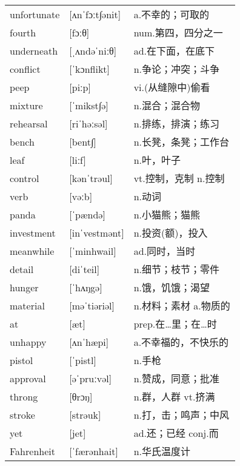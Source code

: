 \documentclass[a4paper]{article}
\begin{document}
\section{}
\begin{tabular}{l l l}

unfortunate & [ʌnˈfɔːt∫ənit] & a.不幸的；可取的 \\
fourth & [fɔːθ] & num.第四，四分之一 \\
underneath & [ˌʌndəˈniːθ] & ad.在下面，在底下 \\
conflict & [ˈkɔnflikt] & n.争论；冲突；斗争 \\
peep & [piːp] & vi.(从缝隙中)偷看 \\
mixture & [ˈmikst∫ə] & n.混合；混合物 \\
rehearsal & [riˈhəːsəl] & n.排练，排演；练习 \\
bench & [bent∫] & n.长凳，条凳；工作台 \\
leaf & [liːf] & n.叶，叶子 \\
control & [kənˈtrəul] & vt.控制，克制 n.控制 \\
verb & [vəːb] & n.动词 \\
panda & [ˈpændə] & n.小猫熊；猫熊 \\
investment & [inˈvestmənt] & n.投资(额)，投入 \\
meanwhile & [ˈminhwail] & ad.同时，当时 \\
detail & [diˈteil] & n.细节；枝节；零件 \\
hunger & [ˈhʌŋgə] & n.饿，饥饿；渴望 \\
material & [məˈtiəriəl] & n.材料；素材 a.物质的 \\
at & [æt] & prep.在…里；在…时 \\
unhappy & [ʌnˈhæpi] & a.不幸福的，不快乐的 \\
pistol & [ˈpistl] & n.手枪 \\
approval & [əˈpruːvəl] & n.赞成，同意；批准 \\
throng & [θrɔŋ] & n.群，人群 vt.挤满 \\
stroke & [strəuk] & n.打，击；鸣声；中风 \\
yet & [jet] & ad.还；已经 conj.而 \\
Fahrenheit & [ˈfærənhait] & n.华氏温度计 \\

\end{tabular}
\end{document}

